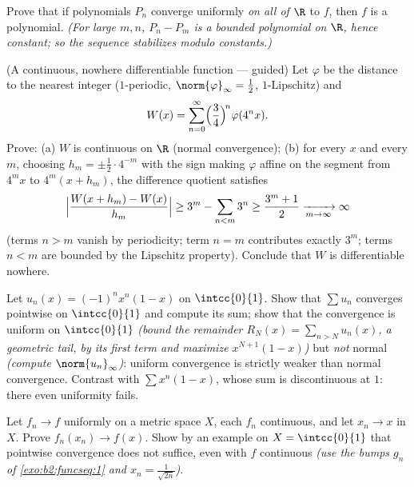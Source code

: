 \begin{exercise}[$\star\star$]\label{exo:b2:funcseq:8}
Prove that if polynomials $P_n$ converge uniformly \emph{on all of
$\R$} to $f$, then $f$ is a polynomial. \emph{(For large $m, n$,
$P_n - P_m$ is a bounded polynomial on $\R$, hence constant; so the
sequence stabilizes modulo constants.)}
\end{exercise}

\begin{exercise}[$\star\star\star$]\label{exo:b2:funcseq:9}
(A continuous, nowhere differentiable function --- guided) Let
$\varphi$ be the distance to the nearest integer ($1$-periodic,
$\norm{\varphi}_\infty = \frac12$, $1$-Lipschitz) and
\[
W(x) = \sum_{n=0}^{\infty} \Bigl(\frac{3}{4}\Bigr)^{\!n}
\varphi(4^n x) .
\]
Prove: (a) $W$ is continuous on $\R$ (normal convergence); (b) for
every $x$ and every $m$, choosing $h_m = \pm\frac12\cdot 4^{-m}$
with the sign making $\varphi$ affine on the segment from $4^m x$
to $4^m(x + h_m)$, the difference quotient satisfies
\[
\Bigl|\frac{W(x + h_m) - W(x)}{h_m}\Bigr| \geq 3^m -
\sum_{n<m} 3^n \geq \frac{3^m + 1}{2} \xrightarrow[m\to\infty]{}
\infty
\]
(terms $n > m$ vanish by periodicity; term $n = m$ contributes
exactly $3^m$; terms $n < m$ are bounded by the Lipschitz property).
Conclude that $W$ is differentiable nowhere.
\end{exercise}

\begin{exercise}[$\star$]\label{exo:b2:funcseq:10}
Let $u_n(x) = (-1)^n x^n(1 - x)$ on $\intcc{0}{1}$. Show that
$\sum u_n$ converges pointwise on $\intcc{0}{1}$ and compute its
sum; show that the convergence is uniform on $\intcc{0}{1}$
\emph{(bound the remainder $R_N(x) = \sum_{n > N} u_n(x)$, a
geometric tail, by its first term and maximize $x^{N+1}(1-x)$)}
but \emph{not} normal \emph{(compute $\norm{u_n}_\infty$)}:
uniform convergence is strictly weaker than normal convergence.
Contrast with $\sum x^n(1-x)$, whose sum is discontinuous at
$1$: there even uniformity fails.
\end{exercise}

\begin{exercise}[$\star\star$]\label{exo:b2:funcseq:11}
Let $f_n \to f$ uniformly on a metric space $X$, each $f_n$
continuous, and let $x_n \to x$ in $X$. Prove $f_n(x_n) \to
f(x)$. Show by an example on $X = \intcc{0}{1}$ that pointwise
convergence does not suffice, even with $f$ continuous
\emph{(use the bumps $g_n$ of \cref{exo:b2:funcseq:1} and $x_n =
\frac{1}{\sqrt{2n}}$)}.
\end{exercise}

